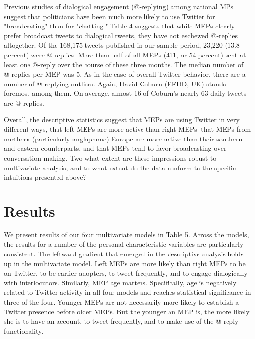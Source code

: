 \documentclass[12pt]{article}\usepackage[]{graphicx}\usepackage[]{color}
\begin{document}
      Previous studies of dialogical engagement (@-replying) among national MPs \cite{shogan.2010} suggest that politicians have been much more likely to use Twitter for "broadcasting" than for "chatting." Table 4 suggests that while MEPs clearly prefer broadcast tweets to dialogical tweets, they have not eschewed @-replies altogether. Of the 168,175 tweets published in our sample period, 23,220 (13.8 percent) were @-replies. More than half of all MEPs (411, or 54 percent) sent at least one @-reply over the course of these three months.  The median number of @-replies per MEP was 5.  As in the case of overall Twitter behavior, there are a number of @-replying outliers. Again, David Coburn (EFDD, UK) stands foremost among them. On average, almost 16 of Coburn's nearly 63 daily tweets are @-replies.
      
      Overall, the descriptive statistics suggest that MEPs are using Twitter in very different ways, that left MEPs are more active than right MEPs, that MEPs from northern (particularly anglophone) Europe are more active than their southern and eastern counterparts, and that MEPs tend to favor broadcasting over conversation-making. Two what extent are these impressions robust to multivariate analysis, and to what extent do the data conform to the specific intuitions presented above? 

\section*{Results}

	We present results of our four multivariate models in Table 5. Across the models, the results for a number of the personal characteristic variables are particularly consistent. The leftward gradient that emerged in the descriptive analysis holds up in the multivariate model. Left MEPs are more likely than right MEPs to be on Twitter, to be earlier adopters, to tweet frequently, and to engage dialogically with interlocutors. Similarly, MEP age matters. Specifically, age is negatively related to Twitter activity in all four models and reaches statistical significance in three of the four. Younger MEPs are not necessarily more likely to establish a Twitter presence before older MEPs. But the younger an MEP is, the more likely she is to have an account, to tweet frequently, and to make use of the @-reply functionality.
	
\end{document}
